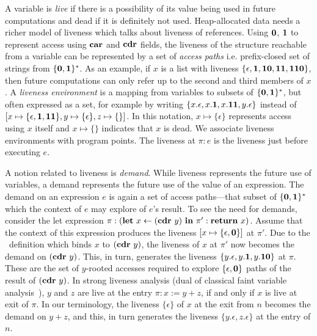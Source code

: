 \documentclass[9pt]{sigplanconf}
\begin{document}
A variable is {\em live} if there  is a possibility of its value being
used in  future computations and  dead if  it is definitely  not used.
Heap-allocated data needs a richer model of liveness which talks about
liveness of  references.  Using  $\mathbf{0}$, $\mathbf{1}$ to  represent access
using  $\mbox{$\mathbf{car}$}$  and  $\mbox{$\mathbf{cdr}$}$  fields,  the  liveness  of  the  structure
reachable from a  variable can be represented by a  set of {\em access
  paths}     i.e.     prefix-closed     set     of    strings     from
$\{\mathbf{0},\mathbf{1}\}^\ast$.  As an example, if $x$ is a list with liveness
$\{\epsilon, \mathbf{1},  \mathbf{1}\mathbf{0}, \mathbf{1}\mathbf{1},  \mathbf{1}\mathbf{1}\mathbf{0}\}$, then
future computations can only refer up  to the second and third members
of $x$.  A  {\em liveness environment} is a mapping  from variables to
subsets of $\{\mathbf{0},\mathbf{1}\}^\ast$,  but often expressed as  a set, for
example by writing $\{x.\epsilon, x.\mathbf{1}, x.\mathbf{1}\mathbf{1}, y.\epsilon\}$
instead       of       $[x       \mapsto\{\epsilon,\mathbf{1},\mathbf{1}\mathbf{1}\},
  y\mapsto\{\epsilon\}, z\mapsto\{\}]$.  In  this notation, $x \mapsto
\{\epsilon\}$ represents access using $x$  itself and $x \mapsto \{\}$
indicates that $x$  is dead.  We associate  liveness environments with
program points.  The  liveness at $\pi:e$ is the  liveness just before
executing $e$.


A  notion  related  to  liveness  is  {\em  demand}.   While  liveness
represents the future use of variables, a demand represents the future
use of the value of an expression.  The demand on an expression $e$ is
again a  set of  access paths---that subset  of $\{\mathbf{0},\mathbf{1}\}^\ast$
which the context of $e$ may explore of $e$'s result.  To see the need
for  demands,  consider   the  let  expression  $\pi:(\mbox{$\mathbf{ let}$}~x\leftarrow
(\mbox{$\mathbf{cdr}$}~y)~\mbox{$\mathbf{ in}$}~  \pi':\mbox{$\mathbf{ return}$}~x)$.  Assume  that  the  context of  this
expression produces  the liveness $[x \mapsto  \lbrace \epsilon, \mathbf{0}
  \rbrace]$ at $\pi'$.  Due to the \LET\ definition which binds $x$ to
$(\mbox{$\mathbf{cdr}$}~y)$, the  liveness of $x$ at  $\pi'$ now becomes the  demand on
$(\mbox{$\mathbf{cdr}$}~y)$.    This,  in   turn,  generates   the  liveness   $\lbrace
y.\epsilon, y.\mathbf{1}, y.\mathbf{1}\mathbf{0} \rbrace$ at $\pi$. These are the set
of $y$-rooted  accesses required  to explore $\lbrace  \epsilon, \mathbf{0}
\rbrace$  paths  of  the  result of  $(\mbox{$\mathbf{cdr}$}~y)$.  In  strong  liveness
analysis       (dual      of       classical      faint       variable
analysis~\cite{horwitz.faint}),  $y$ and  $z$  are live  at the  entry
$\pi: x:=y+z$, if  and only if $x$  is live at exit of  $\pi$.  In our
terminology, the  liveness $\lbrace  \epsilon\rbrace $  of $x$  at the
exit from $n$ becomes the demand on $y+z$, and this, in turn generates
the liveness $\lbrace y.\epsilon, z.\epsilon  \rbrace$ at the entry of
$n$.
\end{document}
